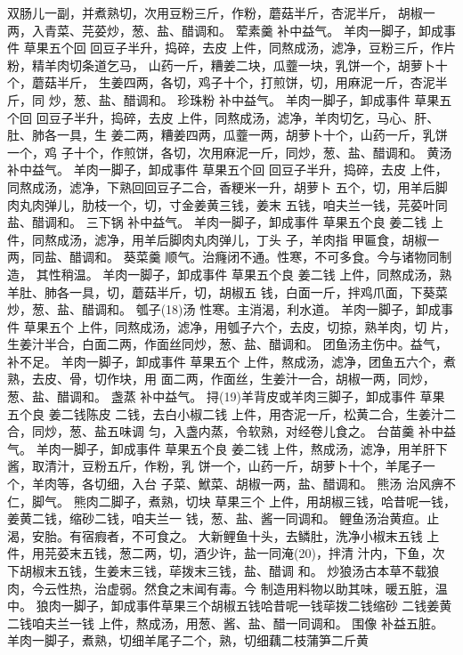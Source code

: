\documentclass[12pt,UTF8]{ctexbook}
\begin{document}
双肠儿一副，并煮熟切，次用豆粉三斤，作粉，蘑菇半斤，杏泥半斤，
胡椒一两，入青菜、芫荽炒，葱、盐、醋调和。
荤素羹 补中益气。
羊肉一脚子，卸成事件 草果五个回 回豆子半升，捣碎，去皮
上件，同熬成汤，滤净，豆粉三斤，作片粉，精羊肉切条道乞马，
山药一斤，糟姜二块，瓜虀一块，乳饼一个，胡萝卜十个，蘑菇半斤，
生姜四两，各切，鸡子十个，打煎饼，切，用麻泥一斤，杏泥半斤，同
炒，葱、盐、醋调和。
珍珠粉 补中益气。
羊肉一脚子，卸成事件 草果五个回 回豆子半升，捣碎，去皮
上件，同熬成汤，滤净，羊肉切乞，马心、肝、肚、肺各一具，生
姜二两，糟姜四两，瓜虀一两，胡萝卜十个，山药一斤，乳饼一个，鸡
子十个，作煎饼，各切，次用麻泥一斤，同炒，葱、盐、醋调和。
黄汤 补中益气。
羊肉一脚子，卸成事件 草果五个回 回豆子半升，捣碎，去皮
上件，同熬成汤，滤净，下熟回回豆子二合，香粳米一升，胡萝卜
五个，切，用羊后脚肉丸肉弹儿，肋枝一个，切，寸金姜黄三钱，姜末
五钱，咱夫兰一钱，芫荽叶同盐、醋调和。
三下锅 补中益气。
羊肉一脚子，卸成事件 草果五个良 姜二钱
上件，同熬成汤，滤净，用羊后脚肉丸肉弹儿，丁头 子，羊肉指
甲匾食，胡椒一两，同盐、醋调和。
葵菜羹 顺气。治癃闭不通。性寒，不可多食。今与诸物同制造，
其性稍温。
羊肉一脚子，卸成事件 草果五个良 姜二钱
上件，同熬成汤，熟羊肚、肺各一具，切，蘑菇半斤，切，胡椒五
钱，白面一斤，拌鸡爪面，下葵菜炒，葱、盐、醋调和。
瓠子(18)汤 性寒。主消渴，利水道。
羊肉一脚子，卸成事件 草果五个
上件，同熬成汤，滤净，用瓠子六个，去皮，切掠，熟羊肉，切
片，生姜汁半合，白面二两，作面丝同炒，葱、盐、醋调和。
团鱼汤主伤中。益气，补不足。
羊肉一脚子，卸成事件 草果五个
上件，熬成汤，滤净，团鱼五六个，煮熟，去皮、骨，切作块，用
面二两，作面丝，生姜汁一合，胡椒一两，同炒，葱、盐、醋调和。
盏蒸 补中益气。
挦(19)羊背皮或羊肉三脚子，卸成事件 草果五个良 姜二钱陈皮
二钱，去白小椒二钱
上件，用杏泥一斤，松黄二合，生姜汁二合，同炒，葱、盐五味调
匀，入盏内蒸，令软熟，对经卷儿食之。
台苗羹 补中益气。
羊肉一脚子，卸成事件 草果五个良 姜二钱
上件，熬成汤，滤净，用羊肝下酱，取清汁，豆粉五斤，作粉，乳
饼一个，山药一斤，胡萝卜十个，羊尾子一个，羊肉等，各切细，入台
子菜、鮲菜、胡椒一两，盐、醋调和。
熊汤 治风痹不仁，脚气。
熊肉二脚子，煮熟，切块 草果三个
上件，用胡椒三钱，哈昔呢一钱，姜黄二钱，缩砂二钱，咱夫兰一
钱，葱、盐、酱一同调和。
鲤鱼汤治黄疸。止渴，安胎。有宿瘕者，不可食之。
大新鲤鱼十头，去鳞肚，洗净小椒末五钱
上件，用芫荽末五钱，葱二两，切，酒少许，盐一同淹(20)，拌清
汁内，下鱼，次下胡椒末五钱，生姜末三钱，荜拨末三钱，盐、醋调
和。
炒狼汤古本草不载狼肉，今云性热，治虚弱。然食之末闻有毒。今
制造用料物以助其味，暖五脏，温中。
狼肉一脚子，卸成事件草果三个胡椒五钱哈昔呢一钱荜拨二钱缩砂
二钱姜黄二钱咱夫兰一钱
上件，熬成汤，用葱、酱、盐、醋一同调和。
围像 补益五脏。
羊肉一脚子，煮熟，切细羊尾子二个，熟，切细藕二枝蒲笋二斤黄
\end{document}
